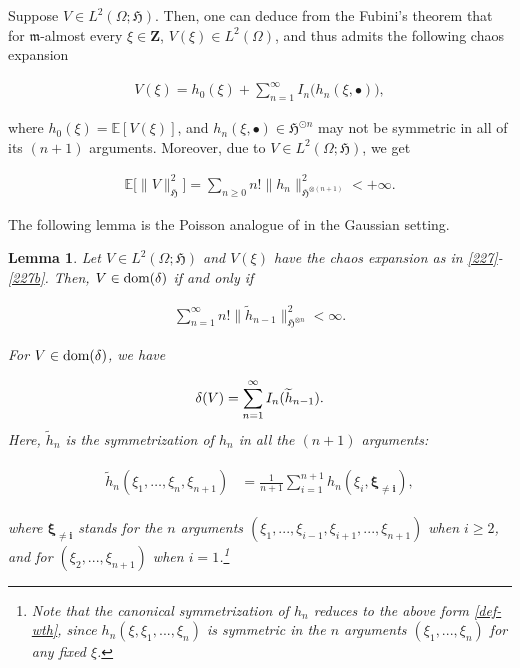 \documentclass[letterpaper, 11pt,  reqno]{amsart}
\newtheorem{lemma}[theorem]{Lemma}
\newcommand{\noi}{\noindent}
\newcommand{\bul}{\bullet}
\newcommand{\E}{\mathbb{E}}
\newcommand{\dl}{\delta}
\newcommand{\wt}{\widetilde}
\renewcommand{\O}{\Omega}
\newcommand{\fm}{\mathfrak{m}}
\newcommand{\fH}{\mathfrak{H}}
\newcommand{\dom}{\textup{dom}}
\numberwithin{equation}{section}
\numberwithin{theorem}{section}
\begin{document}
Suppose $V\in L^2(\O;\fH)$.
Then, one can deduce from the Fubini's theorem
that for $\fm$-almost every $\xi\in\mathbf{Z}$, 
$V(\xi)\in L^2(\O)$, and thus admits the following chaos expansion

\noi
\begin{align}\label{227}
V(\xi) = h_0(\xi) + \sum_{n=1}^\infty I_n\big(  h_n(\xi, \bul)  \big),
\end{align}

\noi
where $h_0(\xi) = \E[ V(\xi)]$, and  $h_n(\xi, \bul)\in \fH^{\odot n}  $ may not
be symmetric in all of its $(n+1)$ arguments.
Moreover, due to $V\in L^2(\O; \fH)$, we get 

\noi
\begin{align}\label{227b}
\E\big[ \| V\|_\fH^2 \big] = \sum_{n\geq 0} n! \| h_n \|^2_{\fH^{\otimes (n+1)}} < +\infty.
\end{align}

The following lemma is the Poisson  analogue of \cite[Proposition 1.3.7]{Nua06} in the Gaussian setting. 


\begin{lemma} \label{lem_dl}
Let  $V\in L^2(\O;\fH)$ and $V(\xi)$ have the chaos expansion as in  \eqref{227}-\eqref{227b}.
Then, $V\in\dom(\dl)$
if and only if 

 \noi
\begin{align}  \label{227d}
\sum_{n=1}^\infty n! \| \wt{h}_{n-1} \|_{\fH^{\otimes n}}^2 < \infty.
\end{align}

\noi
For $V\in\dom(\dl)$, we have
 
 
 \noi
\begin{align}   \notag%
  \dl(V) = \sum_{n=1}^\infty I_n( \wt{h}_{n-1} ).
\end{align}
Here, $\wt{h}_n$ is the symmetrization of $h_n$ in all the $(n+1)$ arguments:

\noi
\begin{align}  \label{def-wth}
\begin{aligned}
\wt{h}_n(\xi_1,\ldots,\xi_n,\xi_{n+1})
&=
\frac{1}{n+1}\sum_{i=1}^{n+1}h_n(\xi_i, \pmb{\xi_{\neq i} } ),
\end{aligned}
\end{align}

\noi
where $\pmb{\xi_{\neq i} } $ stands for the $n$ arguments $(\xi_1, ... , \xi_{i-1}, \xi_{i+1}, ... ,\xi_{n+1})$
when $i\geq 2$,  and for $(\xi_2, ... ,\xi_{n+1})$ when $i=1$.\footnote{Note that the canonical 
symmetrization of $h_n$ reduces to the above form \eqref{def-wth}, since
$h_n(\xi, \xi_1, ... , \xi_n)$ is symmetric in the $n$ arguments $(\xi_1, ... , \xi_n)$
for any fixed $\xi$.}


\end{lemma}
\end{document}
